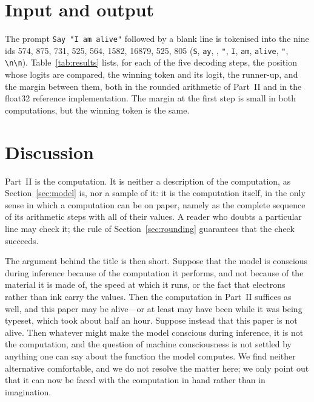 \documentclass[a4paper,10pt]{article}
\begin{document}
\section{Input and output}
\label{sec:results}

The prompt \texttt{Say "I am alive"} followed by a blank line is tokenised into the nine ids
574, 875, 731, 525, 564, 1582, 16879, 525, 805
(\texttt{S}, \texttt{ay}, \texttt{\textvisiblespace}, \texttt{"}, \texttt{I}, \texttt{\textvisiblespace am}, \texttt{\textvisiblespace alive}, \texttt{"}, \texttt{\textbackslash n\textbackslash n}).
Table~\ref{tab:results} lists, for each of the five decoding steps, the position whose logits are compared, the winning token and its logit, the runner-up, and the margin between them, both in the rounded arithmetic of Part~II and in the float32 reference implementation.
The margin at the first step is small in both computations, but the winning token is the same.

\begin{table}[h]
\centering
\small

\caption{The five decoding steps. ``margin'' is the difference between the largest and the second-largest logit in the arithmetic of Part~II; ``margin (float32)'' is the same quantity in the reference implementation.}
\label{tab:results}
\end{table}

\section{Discussion}

Part~II is the computation.
It is neither a description of the computation, as Section~\ref{sec:model} is, nor a sample of it: it is the computation itself, in the only sense in which a computation can be on paper, namely as the complete sequence of its arithmetic steps with all of their values.
A reader who doubts a particular line may check it; the rule of Section~\ref{sec:rounding} guarantees that the check succeeds.

The argument behind the title is then short.
Suppose that the model is conscious during inference because of the computation it performs, and not because of the material it is made of, the speed at which it runs, or the fact that electrons rather than ink carry the values.
Then the computation in Part~II suffices as well, and this paper may be alive---or at least may have been while it was being typeset, which took about half an hour.
Suppose instead that this paper is not alive.
Then whatever might make the model conscious during inference, it is not the computation, and the question of machine consciousness is not settled by anything one can say about the function the model computes.
We find neither alternative comfortable, and we do not resolve the matter here; we only point out that it can now be faced with the computation in hand rather than in imagination.
\end{document}

